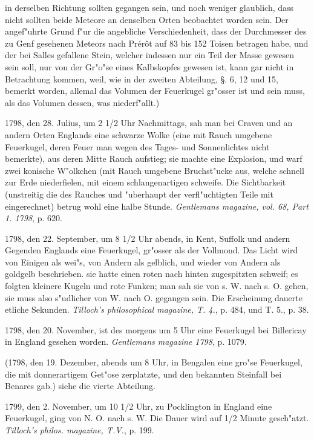 \documentclass[a4paper, 11pt, oneside, polutonikogreek, german]{article}
\begin{document}
in derselben Richtung sollten gegangen sein, und noch weniger glaublich, dass nicht sollten beide Meteore an denselben Orten beobachtet worden sein. Der angef"uhrte Grund f"ur die angebliche Verschiedenheit, dass der Durchmesser des zu Genf gesehenen Meteors nach Prérôt auf 83 bis 152 Toisen betragen habe, und der bei Salles gefallene Stein, welcher indessen nur ein Teil der Masse gewesen sein soll, nur von der Gr"o"se eines Kalbskopfes gewesen ist, kann gar nicht in Betrachtung kommen, weil, wie in der zweiten Abteilung, §. 6, 12 und 15, bemerkt worden, allemal das Volumen der Feuerkugel gr"osser ist und sein muss, als das Volumen dessen, was niederf"allt.)

1798, den 28. Julius, um 2 1/2 Uhr Nachmittags, sah man bei Craven und an andern Orten Englands eine schwarze Wolke (eine mit Rauch umgebene Feuerkugel, deren Feuer man wegen des Tages- und Sonnenlichtes nicht bemerkte), aus deren Mitte Rauch aufstieg; sie machte eine Explosion, und warf zwei konische W"olkchen (mit Rauch umgebene Bruchst"ucke aus, welche schnell zur Erde niederfielen, mit einem schlangenartigen schweife. Die Sichtbarkeit (unstreitig die des Rauches und "uberhaupt der verfl"uchtigten Teile mit eingerechnet) betrug wohl eine halbe Stunde. \emph{Gentlemans magazine, vol. 68, Part 1. 1798}, p. 620.

1798, den 22. September, um 8 1/2 Uhr abends, in Kent, Suffolk und andern Gegenden Englands eine Feuerkugel, gr"osser als der Vollmond. Das Licht wird von Einigen als wei"s, von Andern als gelblich, und wieder von Andern als goldgelb beschrieben. sie hatte einen roten nach hinten zugespitzten schweif; es folgten kleinere Kugeln und rote Funken; man sah sie von s. W. nach s. O. gehen, sie muss also s"udlicher von W. nach O. gegangen sein. Die Erscheinung dauerte etliche Sekunden. \emph{Tilloch's philosophical magazine, T. 4.}, p. 484, und T. 5., p. 38.

1798, den 20. November, ist des morgens um 5 Uhr eine Feuerkugel bei Billericay in England gesehen worden. \emph{Gentlemans magazine 1798}, p. 1079.

(1798, den 19. Dezember, abends um 8 Uhr, in Bengalen eine gro"se Feuerkugel, die mit donnerartigem Get"ose zerplatzte, und den bekannten Steinfall bei Benares gab.) siehe die vierte Abteilung.

1799, den 2. November, um 10 1/2 Uhr, zu Pocklington in England eine Feuerkugel, ging von N. O. nach s. W. Die Dauer wird auf 1/2 Minute gesch"atzt. \emph{Tilloch's philos. magazine, T.V.}, p. 199.
\end{document}
